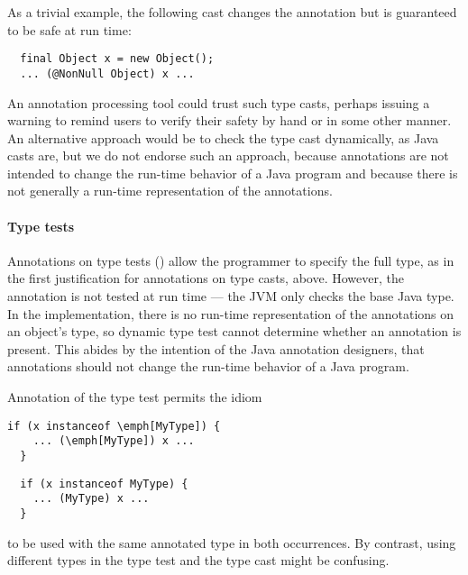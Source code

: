\documentclass[10pt]{article}
\begin{document}
\begin{enumerate}
As a trivial example, the following cast changes the annotation but is
guaranteed to be safe at run time:

\begin{Verbatim}
  final Object x = new Object();
  ... (@NonNull Object) x ...
\end{Verbatim}

An annotation processing tool could trust such type casts, perhaps issuing
a warning to remind users to verify their safety by hand or in some other
manner.  An alternative approach would be to check the type cast
dynamically, as Java casts are, but we do not endorse such an approach,
because annotations are not intended to change the run-time behavior of a
Java program and because there is not generally a run-time representation
of the annotations.


\end{enumerate}


\paragraph{Type tests}
Annotations on type tests () allow the programmer to
specify the full type, as in the first justification for annotations on
type casts, above.  However, the annotation is not tested at run time ---
the JVM only checks the base Java type.
In the
implementation, there is no run-time representation of the annotations on
an object's type, so dynamic type test cannot determine whether an
annotation is present.  This abides by the intention of the Java annotation
designers, that annotations should not change the run-time behavior of a
Java program.

Annotation of the type test permits the idiom

\begin{Verbatim}[commandchars=\\\[\]]
  if (x instanceof \emph[MyType]) {
    ... (\emph[MyType]) x ...
  }
\end{Verbatim}
\begin{Verbatim}
  if (x instanceof MyType) {
    ... (MyType) x ...
  }
\end{Verbatim}

to be used with the same annotated type \emph{} in both
occurrences.  By contrast, using different types in the type test and the
type cast might be confusing.
\end{document}
